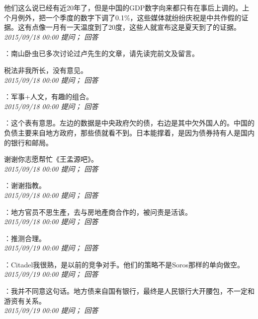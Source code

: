 \documentclass[twocolumn]{ctexart}
\begin{document}
他们这么说已经有近20年了，但是中国的GDP数字向来都只有在事后上调的。上个月例外，把一个季度的数字下调了0.1\%，这些媒体就纷纷庆祝是中共作假的证据。这有点像一月有一天温度到了20度，这些人就宣布这是夏天到了的证据。\\

\textit{\hfill\noindent\small 2015/09/18 00:00 提问； 回答}

：南山卧虫已多次讨论过卢先生的文章，请先读完前文及留言。

税法非我所长，没有意见。\\

\textit{\hfill\noindent\small 2015/09/18 00:00 提问； 回答}

：军事+人文，有趣的组合。\\

\textit{\hfill\noindent\small 2015/09/18 00:00 提问； 回答}

：这个表有意思。左边的数据是中央政府欠的债，右边是其中欠外国人的。中国的负债主要来自地方政府，那些债就看不到。日本能撑着，是因为债券持有人是国内的银行和邮局。

谢谢你志愿帮忙《王孟源吧》。\\

\textit{\hfill\noindent\small 2015/09/18 00:00 提问； 回答}

：谢谢指教。\\

\textit{\hfill\noindent\small 2015/09/18 00:00 提问； 回答}

：地方官员不思生產，去与房地產商合作的，被问责是活该。\\

\textit{\hfill\noindent\small 2015/09/18 00:00 提问； 回答}

：推测合理。\\

\textit{\hfill\noindent\small 2015/09/19 00:00 提问； 回答}

：Citadel我很熟，是以前的竞争对手。他们的策略不是Soros那样的单向做空。\\

\textit{\hfill\noindent\small 2015/09/19 00:00 提问； 回答}

：我并不同意这句话。地方债来自国有银行，最终是人民银行大开腰包，不一定和游资有关系。\\

\textit{\hfill\noindent\small 2015/09/19 00:00 提问； 回答}
\end{document}
